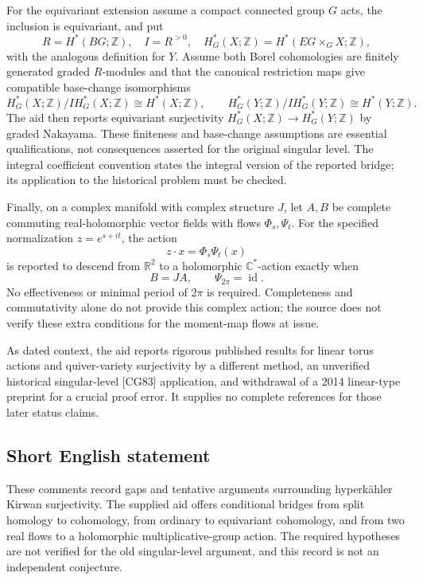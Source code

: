 \documentclass[11pt]{article}
\newcommand{\Z}{\mathbb{Z}}
\newcommand{\R}{\mathbb{R}}
\newcommand{\C}{\mathbb{C}}
\begin{document}
For the equivariant extension assume a compact connected group \(G\) acts, the inclusion is equivariant, and put
\[
 R=H^*(BG;\Z),\quad I=R^{>0},\quad
 H_G^*(X;\Z)=H^*(EG\times_GX;\Z),
\]
with the analogous definition for \(Y\). Assume both Borel cohomologies are finitely generated graded \(R\)-modules and that the canonical restriction maps give compatible base-change isomorphisms
\[
 H_G^*(X;\Z)/I H_G^*(X;\Z)\cong H^*(X;\Z),\qquad
 H_G^*(Y;\Z)/I H_G^*(Y;\Z)\cong H^*(Y;\Z).
\]
The aid then reports equivariant surjectivity \(H_G^*(X;\Z)\to H_G^*(Y;\Z)\) by graded Nakayama. These finiteness and base-change assumptions are essential qualifications, not consequences asserted for the original singular level. The integral coefficient convention states the integral version of the reported bridge; its application to the historical problem must be checked.

Finally, on a complex manifold with complex structure \(J\), let \(A,B\) be complete commuting real-holomorphic vector fields with flows \(\Phi_s,\Psi_t\). For the specified normalization \(z=e^{s+it}\), the action
\[
 z\cdot x=\Phi_s\Psi_t(x)
\]
is reported to descend from \(\R^2\) to a holomorphic \(\C^*\)-action exactly when
\[
 B=JA,\qquad \Psi_{2\pi}=\operatorname{id}.
\]
No effectiveness or minimal period of \(2\pi\) is required. Completeness and commutativity alone do not provide this complex action; the source does not verify these extra conditions for the moment-map flows at issue.

As dated context, the aid reports rigorous published results for linear torus actions and quiver-variety surjectivity by a different method, an unverified historical singular-level [CG83] application, and withdrawal of a 2014 linear-type preprint for a crucial proof error. It supplies no complete references for those later status claims.
\subsection{Short English statement}
These comments record gaps and tentative arguments surrounding hyperkähler Kirwan surjectivity. The supplied aid offers conditional bridges from split homology to cohomology, from ordinary to equivariant cohomology, and from two real flows to a holomorphic multiplicative-group action. The required hypotheses are not verified for the old singular-level argument, and this record is not an independent conjecture.
\end{document}
